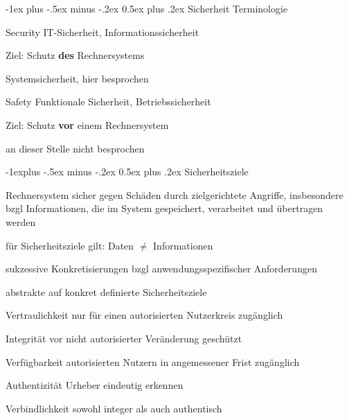 \documentclass[a4paper]{article}
\makeatletter
\renewcommand{\section}{\@startsection{section}{1}{0mm}%
 {-1ex plus -.5ex minus -.2ex}%
 {0.5ex plus .2ex}%
 {\normalfont\large\bfseries}}
\renewcommand{\subsection}{\@startsection{subsection}{2}{0mm}%
 {-1explus -.5ex minus -.2ex}%
 {0.5ex plus .2ex}%
 {\normalfont\normalsize\bfseries}}
\makeatother
\begin{document}
\begin{multicols}{3}
    \section{Sicherheit}
    Terminologie
    \begin{description*}
        \item[Security] IT-Sicherheit, Informationssicherheit
        \begin{itemize*}
            \item Ziel: Schutz \textbf{des} Rechnersystems
            \item Systemsicherheit, hier besprochen
        \end{itemize*}
        \item[Safety] Funktionale Sicherheit, Betriebssicherheit
        \begin{itemize*}
            \item Ziel: Schutz \textbf{vor} einem Rechnersystem
            \item an dieser Stelle nicht besprochen
        \end{itemize*}
    \end{description*}

    \subsection{Sicherheitsziele}
    \begin{itemize*}
        \item Rechnersystem sicher gegen Schäden durch zielgerichtete Angriffe, insbesondere bzgl Informationen, die im System gespeichert, verarbeitet und übertragen werden
        \item für Sicherheitsziele gilt: Daten $\not=$ Informationen
        \item sukzessive Konkretisierungen bzgl anwendungsspezifischer Anforderungen
    \end{itemize*}

    abstrakte auf konkret definierte Sicherheitsziele
    \begin{description*}
        \item[Vertraulichkeit] nur für einen autorisierten Nutzerkreis zugänglich
        \item[Integrität] vor nicht autorisierter Veränderung geschützt
        \item[Verfügbarkeit] autorisierten Nutzern in angemessener Frist zugänglich
        \item[Authentizität] Urheber eindeutig erkennen
        \item[Verbindlichkeit] sowohl integer als auch authentisch
    \end{description*}


\end{multicols}
\end{document}
